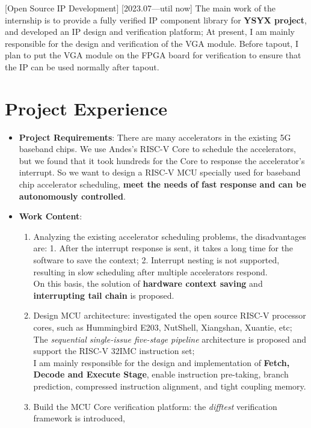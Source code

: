 \documentclass{resume}
\begin{document}
[Open Source IP Development]
[2023.07—util now] 
The main work of the internship is to provide a fully verified IP component library for \textbf{YSYX project}, and developed an IP design and verification platform;
At present, I am mainly responsible for the design and verification of the VGA module. 
Before tapout, I plan to put the VGA module on the FPGA board for verification to ensure that the IP can be used normally after tapout.
\section{Project Experience}
\begin{itemize}
    \item \textbf{Project Requirements}: 
    There are many accelerators in the existing 5G baseband chips. 
    We use Andes's RISC-V Core to schedule the accelerators, but we found that it took hundreds for the Core to response the accelerator's interrupt. 
    So we want to design a RISC-V MCU specially used for baseband chip accelerator scheduling, \textbf{meet the needs of fast response and can be autonomously controlled}.
    \item \textbf{Work Content}: 
    \begin{enumerate}
        \item Analyzing the existing accelerator scheduling problems, the disadvantages are: 1. After the interrupt response is sent, it takes a long time for the software to save the context; 2. Interrupt nesting is not supported, resulting in slow scheduling after multiple accelerators respond.\\
On this basis, the solution of \textbf{hardware context saving} and \textbf{interrupting tail chain} is proposed.
        \item Design MCU architecture: investigated the open source RISC-V processor cores, such as Hummingbird E203, NutShell, Xiangshan, Xuantie, etc;
              The \textit{sequential single-issue five-stage pipeline} architecture is proposed and support the RISC-V 32IMC instruction set; \\
              I am mainly responsible for the design and implementation of \textbf{Fetch, Decode and Execute Stage}, enable instruction pre-taking, branch prediction, compressed instruction alignment, and tight coupling memory.
        \item Build the MCU Core verification platform: the \textit{difftest} verification framework is introduced, 

\end{enumerate}
\end{itemize}
\end{document}
